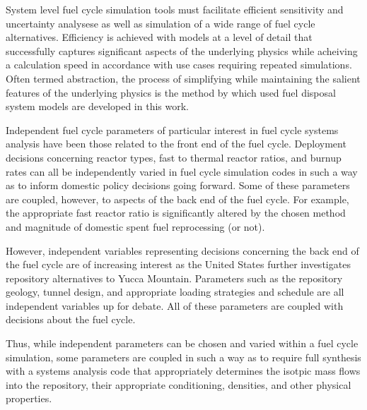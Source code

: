 
System level fuel cycle simulation tools must facilitate efficient sensitivity 
and uncertainty analysese as well as simulation of a wide range of fuel cycle 
alternatives.  Efficiency is achieved with models at a level of detail that 
successfully captures significant aspects of the underlying physics while 
acheiving a calculation speed in accordance with use cases requiring repeated 
simulations. Often termed abstraction, the process of simplifying while 
maintaining the salient features of the underlying physics is the method by 
which used fuel disposal system models are developed in this work. 


Independent fuel cycle parameters of particular interest in fuel cycle systems 
analysis have been those related to the front end of the fuel cycle. Deployment 
decisions concerning reactor types, fast to thermal reactor ratios, and burnup 
rates can all be independently varied in fuel cycle simulation codes in such a 
way as to inform domestic policy decisions going forward. Some of these 
parameters are coupled, however, to aspects of the back end of the fuel cycle.  
For example, the appropriate fast reactor ratio is significantly altered by the 
chosen method and magnitude of domestic spent fuel reprocessing (or not).


However, independent variables representing decisions concerning the back end
of the fuel cycle are of increasing interest as the United States further
investigates repository alternatives to Yucca Mountain.  Parameters such as the
repository geology, tunnel design, and appropriate loading strategies and
schedule are all independent variables up for debate. All of these
parameters are coupled with decisions about the fuel cycle. 


Thus, while independent parameters can be chosen and varied
within a fuel cycle simulation, some parameters are coupled in such a way as to
require full synthesis with a systems analysis code that appropriately
determines the isotpic mass flows into the repository, their appropriate
conditioning, densities, and other physical properties.  

